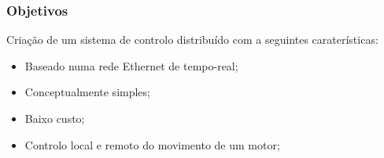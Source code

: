 \begin{frame}
	\frametitle{Objetivos}
	Criaç\~{a}o de um sistema de controlo distribu\'{i}do com a seguintes carater\'{i}sticas:
	\begin{itemize}
		\item Baseado numa rede Ethernet de tempo-real;
		\item Conceptualmente simples;
		\item Baixo custo;
		\item Controlo local e remoto do movimento de um motor;
	\end{itemize}
\end{frame}

